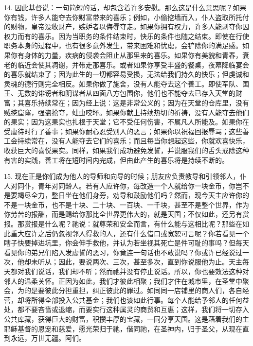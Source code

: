 14. 因此基督说：一句简短的话，却包含着许多安慰。那么这是什么意思呢？如果你有钱，许多人能夺去你财富带来的喜乐；例如，小偷挖墙而入，仆人盗取所托付的财物，皇帝没收财产，嫉妒者以侮辱夺走。如果你拥有权力，许多人能剥夺你因权力而有的喜乐。因为当职务的条件结束时，快乐的条件也随之结束。即使在行使职务本身的过程中，也有很多意外发生，带来困难和忧虑，会铲除你的满足感。如果你有身体的力量，疾病的侵袭会阻止从那里来的喜乐。如果你有美貌和青春，衰老的临近会使其凋谢，并带走那喜乐。或者如果你享受丰盛的餐桌，夜幕降临宴会的喜乐就结束了；因为此生的一切都容易受损，无法给我们持久的快乐；但虔诚和灵魂的德行则完全相反。如果你做了施舍，没有人能夺去这个善工。即使军队、国王、无数的诽谤者和阴谋者从四面八方包围你，他们也不能夺去已存入天堂的财富；其喜乐持续常在；因为经上说：这是非常公义的；因为在天堂的仓库里，没有贼挖窟窿，强盗抢夺，蛀虫咬坏。如果你献上持续热切的祈祷，没有人能夺去他们的果实；因为这果实也扎根于天堂；它不受任何伤害，不属凡人所能及。如果你在受虐待时行了善事；如果你耐心忍受别人的恶言；如果你以祝福回报辱骂；这些善工会持续常在，没有人能夺去它们的喜乐；而且每当你想起这些，你就欢喜快乐，收获巨大的喜悦果实。同样，如果我们成功避免发誓，并说服我们的舌头戒除这种有害的实践，善工将在短时间内完成，但由此产生的喜乐将是持续不断的。\par

15. 现在正是你们成为他人的导师和向导的时候；朋友应负责教导和引领邻人，仆人对同仆，青年对同龄人。若有人应许你，每改造一个人就给你一块金币，你岂不是要竭尽全力，整日坐在他们身旁，劝导和鼓励他们吗？\newline{}然而，现今天主应许你的不是一块金币，也不是十块、二十块、一百块、一千块，甚至不是整个世界，作为你劳苦的报酬，而是赐给你那比全世界更伟大的，就是天国；不仅如此，还另有赏报。那赏报是什么呢？祂说：\newline{}\newline{}就尊荣和安全而言，有什么能与这相比呢？那些在如此重大应许之后仍忽视邻人得救的人，还有什么借口或宽恕可言呢？你若看见一个瞎子快要掉进坑里，你会伸手救他，并认为若坐视其死亡是件可耻的事吗？但每天看见你的弟兄们陷入发虚誓的恶习，你竟连一句话也不敢说吗？\newline{}你或许已经说过一次，他却未听从；因此，要说两次、三次，甚至多次，直到你说服他为止。天主每天都对我们说话，我们却不听；然而祂并没有停止说话。所以，你也要效法这种对邻人的温柔关怀。正因为如此，我们才彼此相聚；我们才住在城市里，在圣堂中聚会，为的是要彼此分担重担，纠正彼此的罪过。\newline{}如同同一店铺里的商人们，各自经营，却将所得全部投入公共基金；我们也该如此行事。每个人能给予邻人的任何益处，都不要吝啬或退缩，而要实行这种属灵的商贸和互惠；\newline{}这样，我们将一切存入公共库藏，获得巨大的财富，积攒丰厚的宝藏，一同分享天国。\newline{}这是藉着我们的主耶稣基督的恩宠和慈爱，愿光荣归于祂，偕同祂，在圣神内，归于圣父，从现在直到永远，万世无疆。阿们。\par


